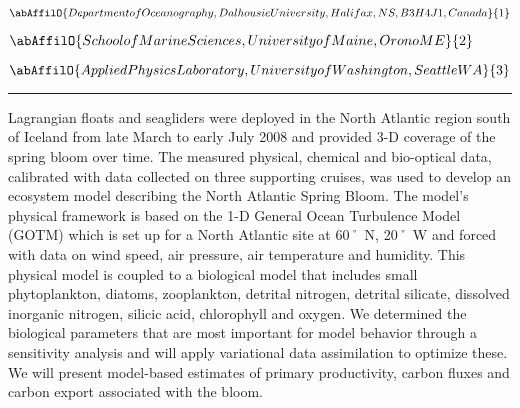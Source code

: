 \begin{minipage}{\linewidth}\begin{center}\begin{minipage}{\linewidth}
   \vspace{2 mm} \begin{center}
    \vspace{2 mm}\begin{center}
  
  $\abAffilO{Department of Oceanography, Dalhousie University, Halifax, NS, B3H 4J1, Canada}{1}$

  
  $\abAffilO{School of Marine Sciences, University of Maine, Orono ME}{2}$

  
  $\abAffilO{Applied Physics Laboratory, University of Washington, Seattle WA}{3}$

  \end{center}
  \vspace{2 mm}
  \end{center}\end{minipage}\end{center}
  \begin{center}\rule{0.70\linewidth}{0.5 pt}\end{center}
  \begin{minipage}{\linewidth}
\noindent Lagrangian floats and seagliders were deployed in the North Atlantic region south of Iceland from late March to early July 2008 and provided 3-D coverage of the spring bloom over time. The measured physical, chemical and bio-optical data, calibrated with data collected on three supporting cruises, was used to develop an ecosystem model describing the North Atlantic Spring Bloom. The model’s physical framework is based on the 1-D General Ocean Turbulence Model (GOTM) which is set up for a North Atlantic site at 60˚ N, 20˚ W and forced with data on wind speed, air pressure, air temperature and humidity. This physical model is coupled to a biological model that includes small phytoplankton, diatoms, zooplankton, detrital nitrogen, detrital silicate, dissolved inorganic nitrogen, silicic acid, chlorophyll and oxygen. We determined the biological parameters that are most important for model behavior through a sensitivity analysis and will apply variational data assimilation to optimize these. We will present model-based estimates of primary productivity, carbon fluxes and carbon export associated with the bloom.
\end{minipage}\end{minipage}
